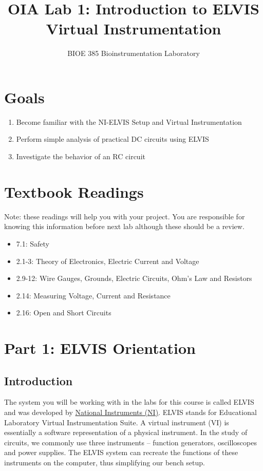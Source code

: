 \documentclass{article}
\title{OIA Lab 1: Introduction to ELVIS Virtual Instrumentation}
\author{BIOE 385 Bioinstrumentation Laboratory}
\date{}
\begin{document}
\large
\maketitle

\section*{Goals}
\begin{enumerate}
	\item Become familiar with the NI-ELVIS Setup and Virtual Instrumentation
	\item Perform simple analysis of practical DC circuits using ELVIS
	\item Investigate the behavior of an RC circuit
\end{enumerate}

\section*{Textbook Readings}
Note: these readings will help you with your project.  You are responsible for knowing this information before next lab although these should be a review.
\begin{itemize}
	\item 7.1: Safety
	\item 2.1-3: Theory of Electronics, Electric Current and Voltage
	\item 2.9-12: Wire Gauges, Grounds, Electric Circuits, Ohm's Law and Resistors
	\item 2.14: Measuring Voltage, Current and Resistance
	\item 2.16: Open and Short Circuits
\end{itemize}

\section*{Part 1: ELVIS Orientation}
\subsection*{Introduction}

The system you will be working with in the labs for this course is called ELVIS and was developed by \href{www.ni.com}{National Instruments (NI)}. ELVIS stands for Educational Laboratory Virtual Instrumentation Suite. A virtual instrument (VI) is essentially a software representation of a physical instrument. In the study of circuits, we commonly use three instruments – function generators, oscilloscopes and power supplies. The ELVIS system can recreate the functions of these instruments on the computer, thus simplifying our bench setup.\\
\end{document}
